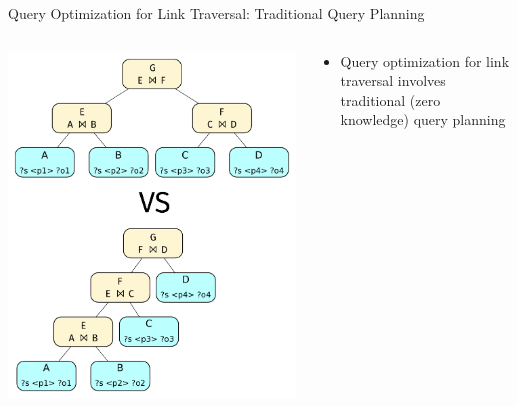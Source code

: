 \begin{frame}{Query Optimization for Link Traversal: Traditional Query Planning}
    \begin{columns}[T] %
        \begin{column}{0.6\textwidth} %
            \includegraphics[width=.85\linewidth]{images/query-planning.pdf} %
        \end{column}

        \begin{column}{0.4\textwidth}
            \begin{itemize}
                \item Query optimization for link traversal involves traditional (zero knowledge) query planning
            \end{itemize}
        \end{column}
    \end{columns}
\end{frame}

